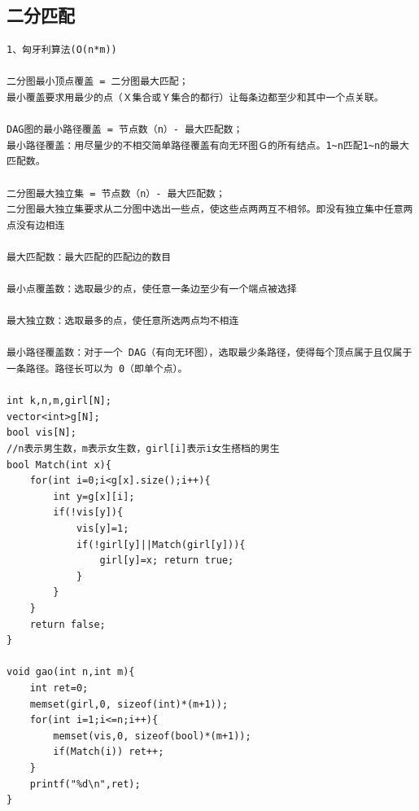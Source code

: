 \documentclass[twoside]{article}
\begin{document}
\subsection{二分匹配}
\begin{lstlisting}
1、匈牙利算法(O(n*m))

二分图最小顶点覆盖 = 二分图最大匹配；
最小覆盖要求用最少的点（Ｘ集合或Ｙ集合的都行）让每条边都至少和其中一个点关联。

DAG图的最小路径覆盖 = 节点数（n）- 最大匹配数；
最小路径覆盖：用尽量少的不相交简单路径覆盖有向无环图Ｇ的所有结点。1~n匹配1~n的最大匹配数。

二分图最大独立集 = 节点数（n）- 最大匹配数；
二分图最大独立集要求从二分图中选出一些点，使这些点两两互不相邻。即没有独立集中任意两点没有边相连

最大匹配数：最大匹配的匹配边的数目

最小点覆盖数：选取最少的点，使任意一条边至少有一个端点被选择

最大独立数：选取最多的点，使任意所选两点均不相连

最小路径覆盖数：对于一个 DAG（有向无环图），选取最少条路径，使得每个顶点属于且仅属于一条路径。路径长可以为 0（即单个点）。

int k,n,m,girl[N];
vector<int>g[N];
bool vis[N];
//n表示男生数，m表示女生数，girl[i]表示i女生搭档的男生
bool Match(int x){
    for(int i=0;i<g[x].size();i++){
        int y=g[x][i];
        if(!vis[y]){
            vis[y]=1;
            if(!girl[y]||Match(girl[y])){
                girl[y]=x; return true;
            }
        }
    }
    return false;
}

void gao(int n,int m){
    int ret=0;
    memset(girl,0, sizeof(int)*(m+1));
    for(int i=1;i<=n;i++){
        memset(vis,0, sizeof(bool)*(m+1));
        if(Match(i)) ret++;
    }
    printf("%d\n",ret);
}
\end{lstlisting}
\end{document}
